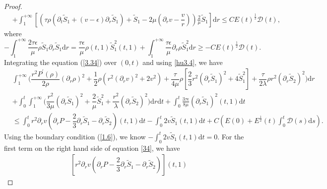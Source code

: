 \documentclass[10pt,reqno]{amsart}
\numberwithin{equation}{section}
\begin{document}
\begin{proof}
\begin{equation}
\begin{aligned}
				&+\int_{1}^{+\infty}\left[\left(\tau   \rho \left(\partial_t \tilde{S}_1+(v-\epsilon)\partial_r\tilde{S}_1 \right) +\tilde{S}_1-2\mu\left(\partial_r v- \dfrac{v}{r}\right)\right) \frac{2}{\mu}\tilde{S}_1\right] \mathrm{d}r
				\leq C E(t)^{\frac{1}{2}}\mathcal{D}(t),
			\end{aligned}
		\end{equation}
		where
		\begin{equation}\nonumber
			-\int_{1}^{+\infty}\frac{2\tau\epsilon}{\mu}\rho\tilde{S}_1
			\partial_r\tilde{S}_1\mathrm{d}r
			=\frac{\tau\epsilon}{\mu}\rho(t,1)\tilde{S}_1^2(t,1)+\int_{1}^{+\infty}\frac{\tau\epsilon}{\mu}\partial_r\rho\tilde{S}_1^2
			\mathrm{d}r
			\geq %
			-C E(t)^{\frac{1}{2}}\mathcal{D}(t).
		\end{equation}
		Integrating the equation (\ref{3.34}) over $(0,t)$ and using \eqref{hu3.4}, we have
		\begin{equation}\label{34}
			\begin{aligned}
				&\int_{1}^{+\infty}\bigg(\dfrac{r^2 P^{\prime}(\rho)}{2\rho} \left(\partial_r \rho\right)^2 +\dfrac{1}{2}\rho\left(r^2 (\partial_rv)^2+2 v^2\right)+\dfrac{\tau  }{4 \mu} \rho \left[\dfrac{2}{3} r^2(\partial_r\tilde{S}_1)^2+4 \tilde{S}_1^2\right]
				+\dfrac{\tau }{2\lambda}\rho r^2 (\partial_r \tilde{S}_2)^2\bigg)\mathrm{d}r\\
				&+\int_{0}^{t}\int_{1}^{+\infty}\bigg(\dfrac{r^2}{3\mu} \left(\partial_r\tilde{S}_1\right)^2+\dfrac{2}{\mu}\tilde{S}_1^2
				+\dfrac{r^2}{\lambda}\left(\partial_r\tilde{S}_2\right)^2
				\bigg)\mathrm{d}r\mathrm{d}t
				+\int_{0}^{t}\frac{3\tau\epsilon}{8\mu}(\partial_{r}\tilde{S}_1)^2 (t,1)\mathrm{d}t\\
				&\leq \int_{0}^{t} r^2\partial_{r}v\left(\partial_{r}P-\dfrac{2}{3}\partial_r\tilde{S}_1-\partial_r\tilde{S}_2\right)(t,1)\mathrm{d}t
				-\int_{0}^{t}2v\tilde{S}_1(t,1)\mathrm{d}t
				+C\left(E(0)+ E^{\frac{1}{2}}(t)\int_{0}^{t} \mathcal{D}(s)\mathrm{d}s\right)
				.
			\end{aligned}
		\end{equation}
		Using the boundary condition (\ref{1.6}), we know $-\int_{0}^{t}2v\tilde{S}_1(t,1)\mathrm{d}t=0$. For the first term on the right hand side of equation \eqref{34}, we have
		\begin{equation}
			\begin{aligned}
				\left[r^2\partial_r v \left( \partial_r P - \dfrac{2}{3}\partial_r \tilde{S}_1 - \partial_r \tilde{S}_2 \right)\right](t,1)

\end{aligned}
\end{equation}
\end{proof}
\end{document}
